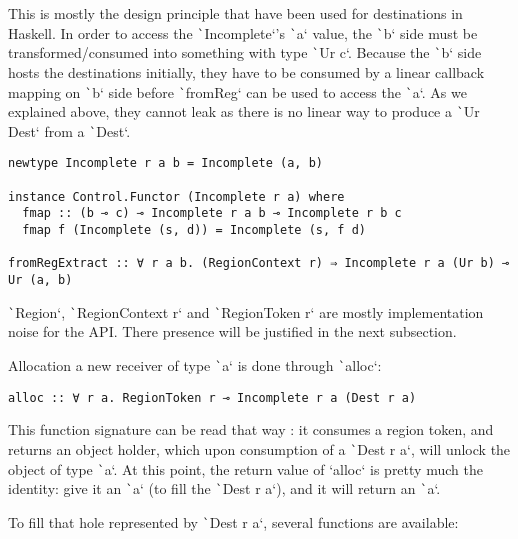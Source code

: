 \documentclass[english]{jflart}
\begin{document}
This is mostly the design principle that have been used for destinations in Haskell. In order to access the \texttt`Incomplete`'s \texttt`a` value, the \texttt`b` side must be transformed/consumed into something with type \texttt`Ur c`. Because the \texttt`b` side hosts the destinations initially, they have to be consumed by a linear callback mapping on \texttt`b` side before \texttt`fromReg` can be used to access the \texttt`a`. As we explained above, they cannot leak as there is no linear way to produce a \texttt`Ur Dest` from a \texttt`Dest`.

\begin{verbatim}
newtype Incomplete r a b = Incomplete (a, b)

instance Control.Functor (Incomplete r a) where
  fmap :: (b ⊸ c) ⊸ Incomplete r a b ⊸ Incomplete r b c
  fmap f (Incomplete (s, d)) = Incomplete (s, f d)

fromRegExtract :: ∀ r a b. (RegionContext r) ⇒ Incomplete r a (Ur b) ⊸ Ur (a, b)
\end{verbatim}

\texttt`Region`, \texttt`RegionContext r` and \texttt`RegionToken r` are mostly implementation noise for the API. There presence will be justified in the next subsection.

Allocation a new receiver of type \texttt`a` is done through \texttt`alloc`:

\begin{verbatim}
alloc :: ∀ r a. RegionToken r ⊸ Incomplete r a (Dest r a)
\end{verbatim}

This function signature can be read that way : it consumes a region token, and returns an object holder, which upon consumption of a \texttt`Dest r a`, will unlock the object of type \texttt`a`. At this point, the return value of `alloc` is pretty much the identity: give it an \texttt`a` (to fill the \texttt`Dest r a`), and it will return an \texttt`a`.

To fill that hole represented by \texttt`Dest r a`, several functions are available:
\end{document}
